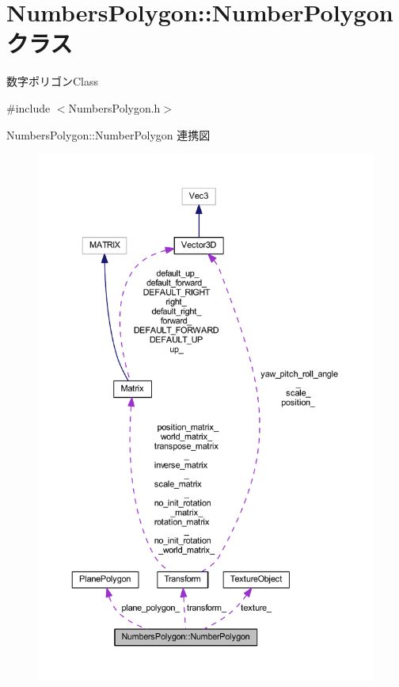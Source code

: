 \hypertarget{class_numbers_polygon_1_1_number_polygon}{}\section{Numbers\+Polygon\+:\+:Number\+Polygon クラス}
\label{class_numbers_polygon_1_1_number_polygon}


数字ポリゴン\+Class  




{\ttfamily \#include $<$Numbers\+Polygon.\+h$>$}



Numbers\+Polygon\+:\+:Number\+Polygon 連携図\nopagebreak
\begin{figure}[H]
\begin{center}
\leavevmode
\includegraphics[width=350pt]{class_numbers_polygon_1_1_number_polygon__coll__graph}
\end{center}
\end{figure}
